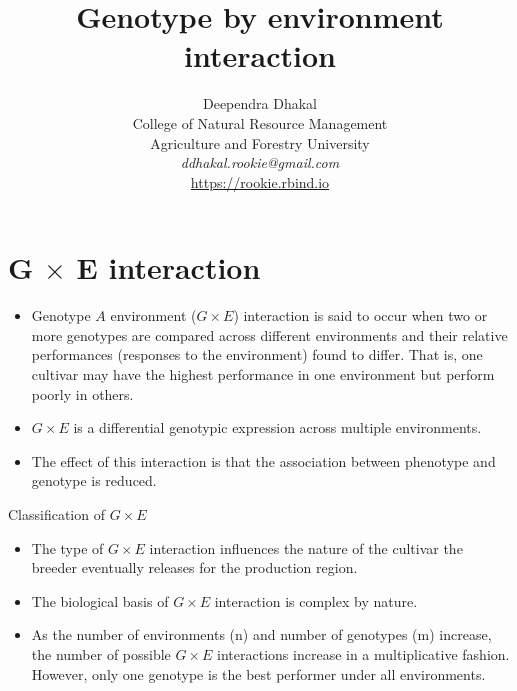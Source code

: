 \documentclass[11pt,dvipsnames,ignorenonframetext,aspectratio=169]{beamer}
\title[]{Genotype by environment interaction}
\author[
        Deependra Dhakal\\
College of Natural Resource Management\\
Agriculture and Forestry University\\
\textit{ddhakal.rookie@gmail.com}\\
\url{https://rookie.rbind.io}
    ]{Deependra Dhakal\\
College of Natural Resource Management\\
Agriculture and Forestry University\\
\textit{ddhakal.rookie@gmail.com}\\
\url{https://rookie.rbind.io}}
\date[
      
  ]{
    }
\providecommand{\tightlist}{%
  \setlength{\itemsep}{0pt}\setlength{\parskip}{0pt}}
\begin{document}
  \begin{frame}[plain]
  \titlepage
  \end{frame}



\hypertarget{g-times-e-interaction}{%
\section{\texorpdfstring{G \(\times\) E
interaction}{G \textbackslash times E interaction}}\label{g-times-e-interaction}}

\begin{frame}{}
\protect\hypertarget{section}{}
\begin{itemize}
\tightlist
\item
  Genotype \(A\) environment (\(G \times E\)) interaction is said to
  occur when two or more genotypes are compared across different
  environments and their relative performances (responses to the
  environment) found to differ. That is, one cultivar may have the
  highest performance in one environment but perform poorly in others.
\item
  \(G \times E\) is a differential genotypic expression across multiple
  environments.
\item
  The effect of this interaction is that the association between
  phenotype and genotype is reduced.
\end{itemize}
\end{frame}

\begin{frame}{Classification of \(G \times E\)}
\protect\hypertarget{classification-of-g-times-e}{}
\begin{itemize}
\tightlist
\item
  The type of \(G \times E\) interaction influences the nature of the
  cultivar the breeder eventually releases for the production region.
\item
  The biological basis of \(G \times E\) interaction is complex by
  nature.
\item
  As the number of environments (n) and number of genotypes (m)
  increase, the number of possible \(G \times E\) interactions increase
  in a multiplicative fashion. However, only one genotype is the best
  performer under all environments.
\end{itemize}
\end{frame}
\end{document}
